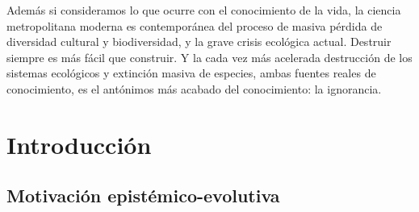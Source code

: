 \documentclass[a4paper,11pt]{book}
\theoremstyle{definition}
\begin{document}
%
Además si consideramos lo que ocurre con el conocimiento de la vida, la ciencia metropolitana moderna es contemporánea del proceso de masiva pérdida de diversidad cultural y biodiversidad, y la grave crisis ecológica actual.
%
Destruir siempre es más fácil que construir.
%
Y la cada vez más acelerada destrucción de los sistemas ecológicos y extinción masiva de especies, ambas fuentes reales de conocimiento, es el antónimos más acabado del conocimiento: la ignorancia.
%
%
%
%
%
%
%












\chapter{Introducción} \label{ch:evo}


\section{Motivación epistémico-evolutiva}
\end{document}
